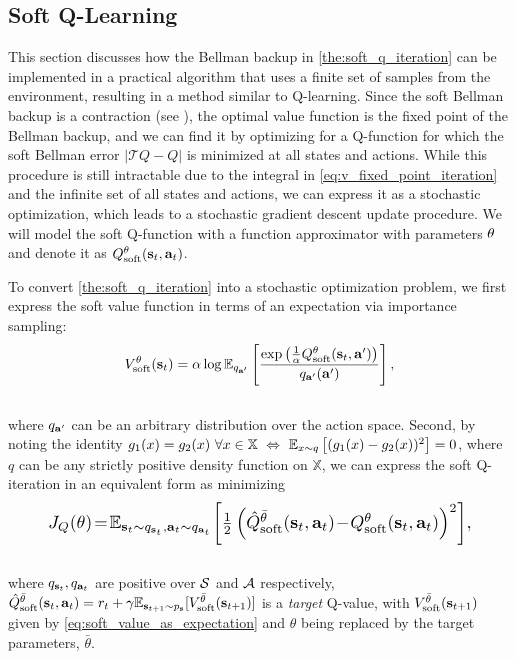 \documentclass{article}
\begin{document}
\subsection{Soft Q-Learning}
\vspace{-1mm}
This section discusses how the Bellman backup in \autoref{the:soft_q_iteration} can be implemented in a practical algorithm that uses a finite set of samples from the environment, resulting in a method similar to Q-learning. Since the soft Bellman backup is a contraction (see ), the optimal value function is the fixed point of the Bellman backup, and we can find it by optimizing for a Q-function for which the soft Bellman error $|\mathcal{T}Q - Q|$ is minimized at all states and actions. While this procedure is still intractable due to the integral in \autoref{eq:v_fixed_point_iteration} and the infinite set of all states and actions, we can express it as a stochastic optimization, which leads to a stochastic gradient descent update procedure. We will model the soft Q-function with a function approximator with parameters ${\theta}$ and denote it as $Q_\mathrm{soft}^{\theta}({\mathbf{s}_t},{\mathbf{a}_t})$. 

To convert \autoref{the:soft_q_iteration} into a stochastic optimization problem, we first express the soft value function in terms of an expectation via importance sampling:
\vspace{-4mm}\\
\begin{align}
V_\mathrm{soft}^{\theta}({\mathbf{s}_t}) = \alpha \log \operatorname{\mathbb{E}}_{q_{\mathbf{a}'}}\left[\frac{\exp\left(\frac{1}{\alpha}Q_\mathrm{soft}^{\theta}({\mathbf{s}_t},\mathbf{a}')\right)}{q_{\mathbf{a}'}(\mathbf{a}')}\right],
\label{eq:soft_value_as_expectation}
\end{align}
\vspace{-4mm}\\
where $q_{\mathbf{a}'}$ can be an arbitrary distribution over the action space. Second, by noting the identity 
$g_1(x) = g_2(x)\ \forall x \in \mathbb{X}\ \Leftrightarrow\ \operatorname{\mathbb{E}}_{x\sim q}\left[(g_1(x) - g_2(x))^2\right] = 0$, where $q$ can be any strictly positive density function on $\mathbb{X}$, we can express the soft Q-iteration in an equivalent form as minimizing
\vspace{-4mm}\\
 \begin{equation}
\resizebox{0.88\hsize}{!}{$\qloss(\qparams)\! =\! \E{\st\sim q_\st,\at\sim q_\at\!}{\frac{1}{2}\left(\Qhatsoft^\qtargetparams(\st, \at)\!-\! \Qsoft^\qparams(\st, \at)\right)^2}\!,$}
\label{eq:qloss}
\end{equation}
\vspace{-4mm}\\
where $q_{\mathbf{s}_t}, q_{\mathbf{a}_t}$ are positive over $\mathcal{S}$ and $\mathcal{A}$ respectively, $\hat Q_\mathrm{soft}^{\bar{{\theta}}}({\mathbf{s}_t}, {\mathbf{a}_t}) = r_t + \gamma\mathbb{E}_{{\mathbf{s}_{t+1}}\sim p_{\mathbf{s}}}[V_\mathrm{soft}^{\bar{\theta}}({\mathbf{s}_{t+1}})]$ is a \emph{target} Q-value, with $V_\mathrm{soft}^{\bar{\theta}}({\mathbf{s}_{t+1}})$ given by \autoref{eq:soft_value_as_expectation} and $\theta$ being replaced by the target parameters, $\bar{\theta}$.
\end{document}
